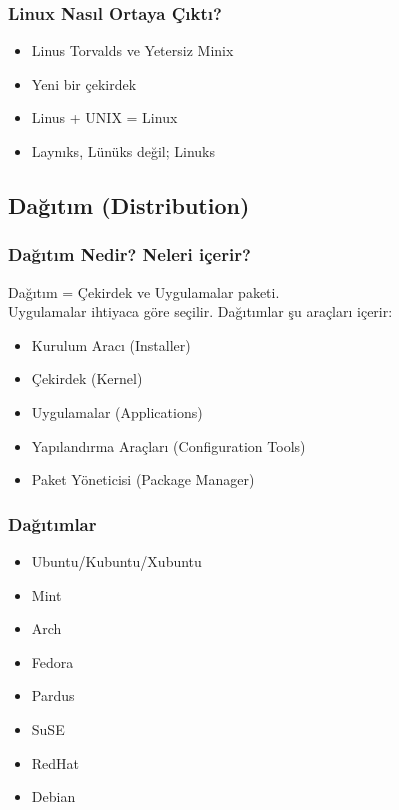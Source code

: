\documentclass{beamer}
\begin{document}
		\begin{frame}
			\frametitle{Linux Nasıl Ortaya Çıktı?}
				\begin{itemize}
					\item Linus Torvalds ve Yetersiz Minix
					\item Yeni bir çekirdek
					\item Linus + UNIX = Linux
					\item Laynıks, Lünüks değil; Linuks
				\end{itemize}  



		\end{frame}
	
	\subsection{Dağıtım (Distribution)}
		\begin{frame}
		 	\frametitle{Dağıtım Nedir? Neleri içerir?}
			Dağıtım = Çekirdek ve Uygulamalar paketi.\\ Uygulamalar ihtiyaca göre seçilir. Dağıtımlar şu araçları içerir:\\
			\begin{itemize}
			 \item Kurulum Aracı (Installer)
			 \item Çekirdek (Kernel)
			 \item Uygulamalar (Applications)
			 \item Yapılandırma Araçları (Configuration Tools)
			 \item Paket Yöneticisi (Package Manager)
			\end{itemize}

		\end{frame}
		
		\begin{frame}
		 	\frametitle{Dağıtımlar}
			\begin{itemize}
			 \item Ubuntu/Kubuntu/Xubuntu
			 \item Mint			 
			 \item Arch
 			 \item Fedora
			 \item Pardus
			 \item SuSE
			 \item RedHat
			 \item Debian
			\end{itemize}
		\end{frame}
\end{document}
